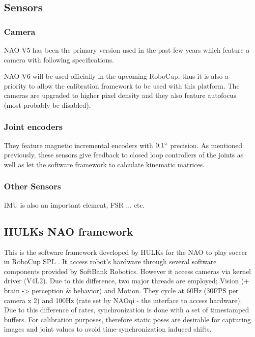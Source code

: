 \documentclass[english, printversion, nomenclature, notitle]{tuvisionthesis} %
\begin{document}
\subsection{Sensors}
\subsubsection{Camera}
NAO V5 has been the primary version used in the past few years which feature a camera with following specifications.

NAO V6 will be used officially in the upcoming RoboCup, thus it is also a priority to allow the calibration framework to be used with this platform. The cameras are upgraded to higher pixel density and they also feature autofocus (most probably be disabled).

\subsubsection{Joint encoders}
\label{subsub:jointEncoders}

They feature magnetic incremental encoders with $0.1\degree$ precision. As mentioned previously, these sensors give feedback to closed loop controllers of the joints as well as let the software framework to calculate kinematic matrices. 

\subsubsection{Other Sensors}
IMU is also an important element, FSR ... etc. 

\subsection{HULKs NAO framework}
This is the software framework developed by HULKs for the NAO to play soccer in RoboCup SPL . It access robot's hardware through several software components provided by SoftBank Robotics. However it access cameras via kernel driver (V4L2). Due to this difference, two major threads are employed; Vision (+ brain -> perception \& behavior) and Motion. They cycle at 60Hz (30FPS per camera x 2) and 100Hz (rate set by NAOqi - the interface to access hardware). Due to this difference of rates, synchronization is done with a set of timestamped buffers. For calibration purposes, therefore static poses are desirable for capturing images and joint values to avoid time-synchronization induced shifts. 
\end{document}
